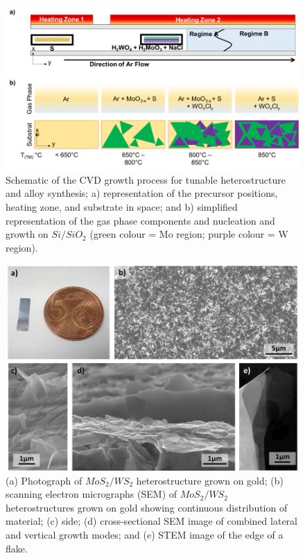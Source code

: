 \begin{figure}[h]
	\begin{center}
		\includegraphics[scale=0.5]{Heterostructures/CVDGrowthSetup.png}
		\caption{Schematic of the CVD growth process for tunable heterostructure and alloy synthesis; a) representation of the precursor positions, heating zone, and substrate in space; and b) simplified representation of the gas phase components and nucleation and growth on $Si/SiO_2$ (green colour = Mo region;  purple colour = W region).}
		\label{fig:HeterostructureCVDGrowthSetup}
	\end{center}
\end{figure}

\begin{figure}[h]
	\begin{center}
		\includegraphics[scale=0.5]{Heterostructures/SEMImages.png}
		\caption{(a) Photograph of $MoS_2/WS_2$ heterostructure grown on gold; (b) scanning electron micrographs (SEM) of $MoS_2/WS_2$ heterostructures grown on gold showing continuous distribution of material; (c) side; (d) cross-sectional SEM image of combined lateral and vertical growth modes; and (e) STEM image of the edge of a flake.}
		\label{fig:HeterostructureSEMImages}
	\end{center}
\end{figure}

